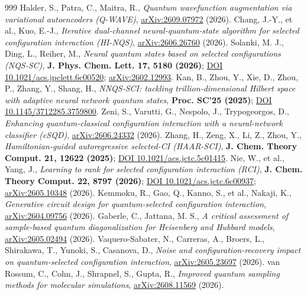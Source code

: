\documentclass[onecolumn,a4paper]{quantumarticle}
\begin{document}
\begin{thebibliography}{999}
 Halder, S., Patra, C., Maitra, R., \emph{Quantum wavefunction augmentation via variational autoencoders (Q-WAVE)}, \href{https://arxiv.org/abs/2609.07972}{arXiv:2609.07972} (2026).
 Chang, J.-Y., et al., Kuo, E.-J., \emph{Iterative dual-channel neural-quantum-state algorithm for selected configuration interaction (HI-NQS)}, \href{https://arxiv.org/abs/2606.26760}{arXiv:2606.26760} (2026).
 Solanki, M. J., Ding, L., Reiher, M., \emph{Neural quantum states based on selected configurations (NQS-SC)}, \textbf{J. Phys. Chem. Lett. 17, 5180 (2026)}; \href{https://doi.org/10.1021/acs.jpclett.6c00520}{DOI 10.1021/acs.jpclett.6c00520}; \href{https://arxiv.org/abs/2602.12993}{arXiv:2602.12993}.
 Kan, B., Zhou, Y., Xie, D., Zhou, P., Zhang, Y., Shang, H., \emph{NNQS-SCI: tackling trillion-dimensional Hilbert space with adaptive neural network quantum states}, \textbf{Proc. SC'25 (2025)}; \href{https://doi.org/10.1145/3712285.3759800}{DOI 10.1145/3712285.3759800}.
 Zeni, S., Varutti, G., Nespolo, J., Trypogeorgos, D., \emph{Enhancing quantum-classical configuration interaction with a neural-network classifier (cSQD)}, \href{https://arxiv.org/abs/2606.24332}{arXiv:2606.24332} (2026).
 Zhang, H., Zeng, X., Li, Z., Zhou, Y., \emph{Hamiltonian-guided autoregressive selected-CI (HAAR-SCI)}, \textbf{J. Chem. Theory Comput. 21, 12622 (2025)}; \href{https://doi.org/10.1021/acs.jctc.5c01415}{DOI 10.1021/acs.jctc.5c01415}.
 Nie, W., et al., Yang, J., \emph{Learning to rank for selected configuration interaction (RCI)}, \textbf{J. Chem. Theory Comput. 22, 8797 (2026)}; \href{https://doi.org/10.1021/acs.jctc.6c00937}{DOI 10.1021/acs.jctc.6c00937}; \href{https://arxiv.org/abs/2605.10348}{arXiv:2605.10348} (2026).
 Kemmoku, R., Gao, Q., Kanno, S., et al., Nakaji, K., \emph{Generative circuit design for quantum-selected configuration interaction}, \href{https://arxiv.org/abs/2604.09756}{arXiv:2604.09756} (2026).
 Gaberle, C., Jattana, M. S., \emph{A critical assessment of sample-based quantum diagonalization for Heisenberg and Hubbard models}, \href{https://arxiv.org/abs/2605.02494}{arXiv:2605.02494} (2026).
 Vaquero-Sabater, N., Carreras, A., Broers, L., Shirakawa, T., Yunoki, S., Casanova, D., \emph{Noise and configuration-recovery impact on quantum-selected configuration interaction}, \href{https://arxiv.org/abs/2605.23697}{arXiv:2605.23697} (2026).
 van Rossum, C., Cohn, J., Shrapnel, S., Gupta, R., \emph{Improved quantum sampling methods for molecular simulations}, \href{https://arxiv.org/abs/2608.11569}{arXiv:2608.11569} (2026).

\end{thebibliography}
\end{document}
